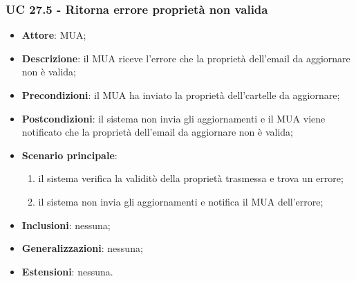     \subsubsection{UC 27.5 - Ritorna errore proprietà non valida} \label{sec:UC27.5}
    \begin{itemize}
        \item \textbf{Attore}: MUA;
        \item \textbf{Descrizione}: il MUA riceve l'errore che la proprietà dell'email da aggiornare non è valida;
        \item \textbf{Precondizioni}: il MUA ha inviato la proprietà dell'cartelle da aggiornare;
        \item \textbf{Postcondizioni}: il sistema non invia gli aggiornamenti e il MUA viene notificato che la proprietà dell'email da aggiornare non è valida;
        \item \textbf{Scenario principale}:
            \begin{enumerate}
                \item il sistema verifica la validitò della proprietà trasmessa e trova un errore;
                \item il sistema non invia gli aggiornamenti e notifica il MUA dell'errore;
            \end{enumerate}
        \item \textbf{Inclusioni}: nessuna;
        \item \textbf{Generalizzazioni}: nessuna;
        \item \textbf{Estensioni}: nessuna.
    \end{itemize}